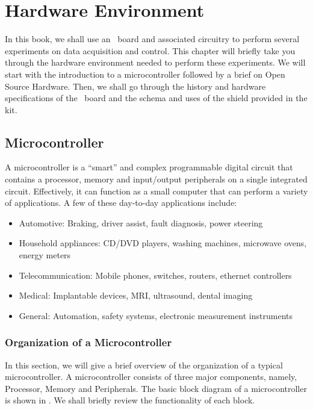 \chapter{Hardware Environment}
\thispagestyle{empty}
\label{sec:hw-env}
\newcommand{\LocHWfig}{\Origin/user-code/hw-env/figures}
\newcommand{\LocHWscicode}{\Origin/user-code/hw-env/scilab}
\newcommand{\LocHWscibrief}{Origin/user-code/hw-env/scilab}
\newcommand{\LocHWardcode}{\Origin/user-code/hw-env/arduino}
\newcommand{\LocHWardbrief}{\tt Origin/user-code/hw-env/arduino}
\newcommand{\LocSH}{\Origin/tools/shield}
\newcommand{\LocSHbrief}[1]{{\tt Origin/tools/shield/#1}, see \fnrefp{fn:file-loc}}

In this book, we shall use an \arduino\ board and associated circuitry
to perform several experiments on data acquisition and control. This
chapter will briefly take you through the hardware environment needed
to perform these experiments. We will start with the introduction to a
microcontroller followed by a brief on Open Source Hardware. Then, we
shall go through the history and hardware specifications of the
\arduino\ board and the schema and uses of the shield provided in
the kit.


\section{Microcontroller}
A microcontroller is a ``smart'' and complex programmable digital circuit
that contains a processor, memory and input/output peripherals on a
single integrated circuit. Effectively, it can function as a small
computer that can perform a variety of applications. A few of these
day-to-day applications include:
\begin{itemize}
  \item Automotive: Braking, driver assist, fault diagnosis, power
        steering
  \item Household appliances: CD/DVD players, washing machines,
        microwave ovens, energy meters
  \item Telecommunication: Mobile phones, switches, routers, ethernet
        controllers
  \item Medical: Implantable devices, MRI, ultrasound, dental imaging
  \item General: Automation, safety systems, electronic measurement
        instruments
\end{itemize}

\subsection{Organization of a Microcontroller}
In this section, we will give a brief overview of the organization of
a typical microcontroller.  A microcontroller consists of three major
components, namely, Processor, Memory and Peripherals. The basic block
diagram of a microcontroller is shown in . We shall
briefly review the functionality of each block.

